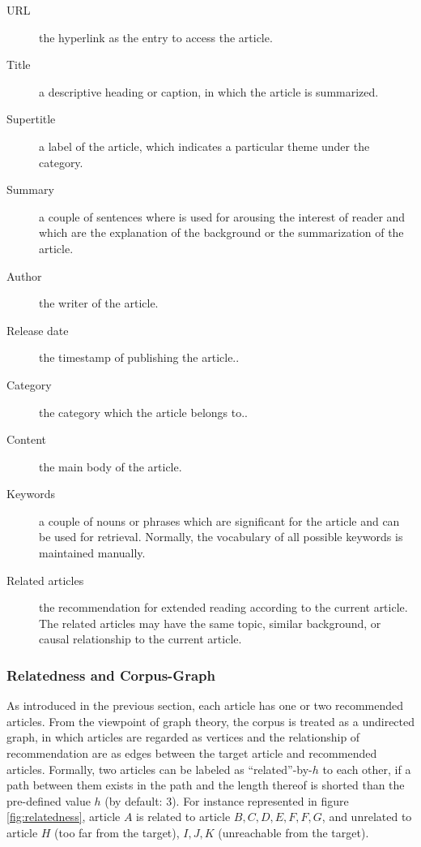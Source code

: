 \begin{description}
    \item[URL] the hyperlink as the entry to access the article.

    \item[Title] a descriptive heading or caption, in which the article is summarized.
    \item[Supertitle] a label of the article, which indicates a particular theme under the category.
    \item[Summary] a couple of sentences where is used for arousing the interest of reader and which are the explanation of the background or the summarization of the article. 
    \item[Author] the writer of the article.
    \item[Release date] the timestamp of publishing the article..
    \item[Category] the category which the article belongs to..

    \item[Content] the main body of the article.
    
    \item[Keywords] a couple of nouns or phrases which are significant for the article and can be used for retrieval. Normally, the vocabulary of all possible keywords is maintained manually. 

    
    \item[Related articles] the recommendation for extended reading according to the current article. The related articles may have the same topic, similar background, or causal relationship to the current article.

        
\end{description}

\subsubsection{Relatedness and Corpus-Graph}

As introduced in the previous section, each article has one or two recommended articles. From the viewpoint of graph theory, the corpus is treated as a undirected graph, in which articles are regarded as vertices and the relationship of recommendation are as edges between the target article and recommended articles. Formally, two articles can be labeled as ``related''-by-$h$ to each other, if a path between them exists in the path and the length thereof is shorted than the pre-defined value $h$ (by default: 3). For instance represented in figure \ref{fig:relatedness}, article $A$ is related to article $B, C, D, E, F, F, G$, and unrelated to  article $H$ (too far from the target), $I, J, K$ (unreachable from the target). 
 
